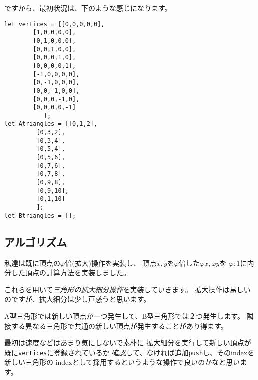 \documentclass[dvipdfmx,uplatex,12pt]{jsarticle}
\begin{document}
ですから、最初状況は、下のような感じになります。


\begin{lstlisting}[caption=初期化]
let vertices = [[0,0,0,0,0],
		[1,0,0,0,0],
		[0,1,0,0,0],
		[0,0,1,0,0],
		[0,0,0,1,0],
		[0,0,0,0,1],
		[-1,0,0,0,0],
		[0,-1,0,0,0],
		[0,0,-1,0,0],
		[0,0,0,-1,0],
		[0,0,0,0,-1]
	       ];
let Atriangles = [[0,1,2],
		 [0,3,2],
		 [0,3,4],
		 [0,5,4],
		 [0,5,6],
		 [0,7,6],
		 [0,7,8],
		 [0,9,8],
		 [0,9,10],
		 [0,1,10]
		 ];
let Btriangles = [];
\end{lstlisting}

\subsection{アルゴリズム}
私達は既に頂点の$\varphi$倍(拡大)操作を実装し、
頂点$x,y$を$\varphi$倍した$\varphi{x},\varphi{y}$を
$\varphi:1$に内分した頂点の計算方法を実装しました。

これらを用いて\underline{\em 三角形の拡大細分操作}を実装していきます。
拡大操作は易しいのですが、拡大細分は少し戸惑うと思います。

A型三角形では新しい頂点が一つ発生して、B型三角形では２つ発生します。
隣接する異なる三角形で共通の新しい頂点が発生することがあり得ます。

最初は速度などはあまり気にしないで素朴に
拡大細分を実行して新しい頂点が既に\verb+vertices+に登録されているか
確認して、なければ追加\verb+push+し、そのindexを新しい三角形の
indexとして採用するというような操作で良いのかなと思います。
\end{document}

